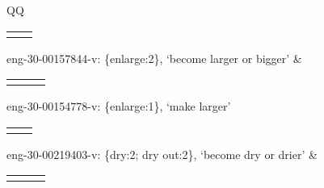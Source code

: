 \documentclass[output=paper,colorlinks,citecolor=brown]{langscibook}
\begin{document}
\begin{table}
\begin{tabularx}{\textwidth}{QQ}
{}\newline
{\begin{tabular}{ll}
\hlblue{Item} &
\end{tabular}
} \newline  eng-30-00157844-v: \{enlarge:2\}, `become larger or bigger'
&\newline
{\begin{tabular}{lll}
\hlblue{Item} & \hlred{Agent}  & \hlteal{Cause}
\end{tabular}
} \newline  eng-30-00154778-v: \{enlarge:1\}, `make larger' \\\midrule
{}\newline
{\begin{tabular}{ll}
\hlblue{Item} &
\end{tabular}
} \newline  eng-30-00219403-v: \{dry:2; dry out:2\}, `become dry or drier'
&\newline
{\begin{tabular}{lll}
\hlblue{Dryee} & \hlred{Agent}   & \hlteal{Cause}
\end{tabular}
}
\end{tabularx}
\end{table}
\end{document}
